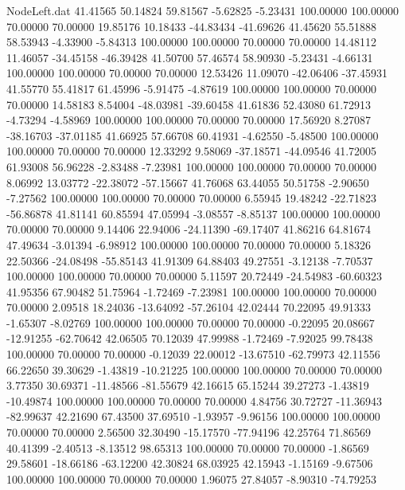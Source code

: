 \begin{filecontents}{NodeLeft.dat}
  41.41565   50.14824   59.81567    -5.62825   -5.23431  100.00000  100.00000   70.00000   70.00000   19.85176   10.18433  -44.83434  -41.69626
  41.45620   55.51888   58.53943    -4.33900   -5.84313  100.00000  100.00000   70.00000   70.00000   14.48112   11.46057  -34.45158  -46.39428
  41.50700   57.46574   58.90930    -5.23431   -4.66131  100.00000  100.00000   70.00000   70.00000   12.53426   11.09070  -42.06406  -37.45931
  41.55770   55.41817   61.45996    -5.91475   -4.87619  100.00000  100.00000   70.00000   70.00000   14.58183    8.54004  -48.03981  -39.60458
  41.61836   52.43080   61.72913    -4.73294   -4.58969  100.00000  100.00000   70.00000   70.00000   17.56920    8.27087  -38.16703  -37.01185
  41.66925   57.66708   60.41931    -4.62550   -5.48500  100.00000  100.00000   70.00000   70.00000   12.33292    9.58069  -37.18571  -44.09546
  41.72005   61.93008   56.96228    -2.83488   -7.23981  100.00000  100.00000   70.00000   70.00000    8.06992   13.03772  -22.38072  -57.15667
  41.76068   63.44055   50.51758    -2.90650   -7.27562  100.00000  100.00000   70.00000   70.00000    6.55945   19.48242  -22.71823  -56.86878
  41.81141   60.85594   47.05994    -3.08557   -8.85137  100.00000  100.00000   70.00000   70.00000    9.14406   22.94006  -24.11390  -69.17407
  41.86216   64.81674   47.49634    -3.01394   -6.98912  100.00000  100.00000   70.00000   70.00000    5.18326   22.50366  -24.08498  -55.85143
  41.91309   64.88403   49.27551    -3.12138   -7.70537  100.00000  100.00000   70.00000   70.00000    5.11597   20.72449  -24.54983  -60.60323
  41.95356   67.90482   51.75964    -1.72469   -7.23981  100.00000  100.00000   70.00000   70.00000    2.09518   18.24036  -13.64092  -57.26104
  42.02444   70.22095   49.91333    -1.65307   -8.02769  100.00000  100.00000   70.00000   70.00000   -0.22095   20.08667  -12.91255  -62.70642
  42.06505   70.12039   47.99988    -1.72469   -7.92025   99.78438  100.00000   70.00000   70.00000   -0.12039   22.00012  -13.67510  -62.79973
  42.11556   66.22650   39.30629    -1.43819  -10.21225  100.00000  100.00000   70.00000   70.00000    3.77350   30.69371  -11.48566  -81.55679
  42.16615   65.15244   39.27273    -1.43819  -10.49874  100.00000  100.00000   70.00000   70.00000    4.84756   30.72727  -11.36943  -82.99637
  42.21690   67.43500   37.69510    -1.93957   -9.96156  100.00000  100.00000   70.00000   70.00000    2.56500   32.30490  -15.17570  -77.94196
  42.25764   71.86569   40.41399    -2.40513   -8.13512   98.65313  100.00000   70.00000   70.00000   -1.86569   29.58601  -18.66186  -63.12200
  42.30824   68.03925   42.15943    -1.15169   -9.67506  100.00000  100.00000   70.00000   70.00000    1.96075   27.84057   -8.90310  -74.79253

\end{filecontents}
